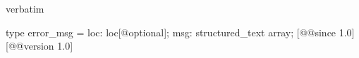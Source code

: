 \begin{camlexample}{verbatim}
\begin{caml}
\begin{camlinput}
type error_msg = { loc: loc[@optional]; msg: structured_text array; } [@@since 1.0]
[@@version 1.0]
\end{camlinput}
\end{caml}
\end{camlexample}
